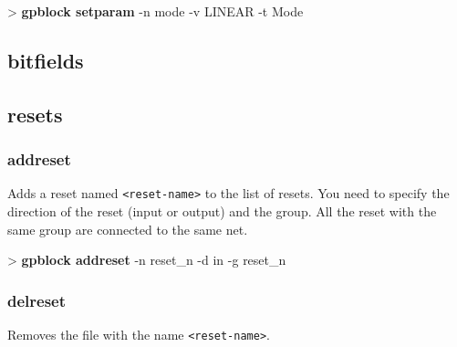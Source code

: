\documentclass[10pt,a4paper]{article}
\begin{document}
\begin{sampletitle}
> \textbf{gpblock setparam} -n mode -v LINEAR -t Mode \\
\end{sampletitle}

\subsection{bitfields}

\subsection{resets}
\subsubsection{addreset}

Adds a reset named \texttt{<reset-name>} to the list of resets. You need to specify the direction of the reset (input or output) and the group. All the reset with the same group are connected to the same net.


\begin{sampletitle}
> \textbf{gpblock addreset} -n reset\_n -d in -g reset\_n
\end{sampletitle}


\subsubsection{delreset}

Removes the file with the name \texttt{<reset-name>}.

\end{document}
